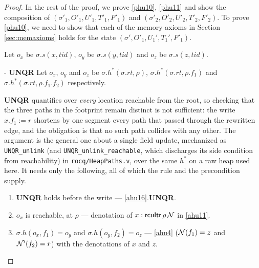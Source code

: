 \begin{proof}
In the rest of the proof, we prove \ref{phu10}, \ref{phu11} and show the composition of $(\sigma'_1, O'_1, U'_1,T'_1,F'_1)$ and  $(\sigma'_2, O'_2, U'_2,T'_2,F'_2)$. To prove \ref{phu10}, we need to show that each of the memory axioms in Section \ref{sec:memaxioms} holds for the state $(\sigma',O'_1,U_1',T_1',F'_1)$.

Let $o_x$ be $\sigma.s(x,tid)$, $o_y$ be $\sigma.s(y,tid)$ and $o_z$ be $\sigma.s(z,tid)$.
\begin{case}\label{unqr} - \textbf{UNQR}
Let $o_x$, $o_y$ and $o_z$ be $\sigma.h^{*}(\sigma.rt,\rho)$,
$\sigma.h^{*}(\sigma.rt,\rho.f_1)$ and $\sigma.h^{*}(\sigma.rt,\rho.f_1.f_2)$
respectively.

\textbf{UNQR} quantifies over \emph{every} location reachable from the root, so
checking that the three paths in the footprint remain distinct is not sufficient:
the write $x.f_1 := r$ shortens by one segment every path that passed through the
rewritten edge, and the obligation is that no such path collides with any other.
The argument is the general one about a single field update, mechanized as
\texttt{UNQR\_unlink} (and \texttt{UNQR\_unlink\_reachable}, which discharges its
side condition from reachability) in \texttt{rocq/HeapPaths.v}, over the same
$h^{*}$ on a raw heap used here.  It needs only the following, all of which the
rule and the precondition supply.

\begin{enumerate}
\item \textbf{UNQR} holds before the write --- \ref{ahu16}.\textbf{UNQR}.
\item $o_x$ is reachable, at $\rho$ --- denotation of $x:\textsf{rcuItr}\,\rho\,\mathcal{N}$
  in \ref{ahu11}.
\item $\sigma.h(o_x,f_1) = o_y$ and $\sigma.h(o_y,f_2) = o_z$ --- \ref{ahu4}
  ($\mathcal{N}(f_1) = z$ and $\mathcal{N}'(f_2) = r$) with the denotations of $x$ and $z$.
\end{enumerate}


\end{case}
\end{proof}
